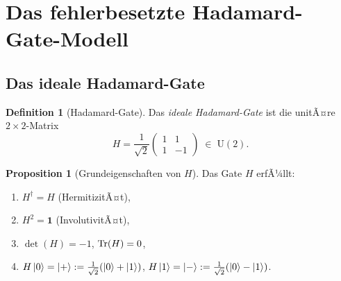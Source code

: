 ﻿\documentclass[11pt,a4paper]{article}
\theoremstyle{definition}
\newtheorem{proposition}[theorem]{Proposition}
\newtheorem{definition}[theorem]{Definition}
\begin{document}
\section{Das fehlerbesetzte Hadamard-Gate-Modell}
\label{sec:model}

\subsection{Das ideale Hadamard-Gate}
\label{subsec:ideal}

\begin{definition}[Hadamard-Gate]
  Das \emph{ideale Hadamard-Gate} ist die unitÃ¤re $2\times2$-Matrix
  \begin{equation}
    H = \frac{1}{\sqrt{2}} \begin{pmatrix} 1 & 1 \\ 1 & -1 \end{pmatrix}
    \;\in\; \mathrm{U}(2).
    \label{eq:H_def}
  \end{equation}
\end{definition}

\begin{proposition}[Grundeigenschaften von $H$]
\label{prop:H_props}
  Das Gate $H$ erfÃ¼llt:
  \begin{enumerate}[label=(\alph*)]
    \item $H^\dagger = H$ (HermitizitÃ¤t),
    \item $H^2 = \mathbf{1}$ (InvolutivitÃ¤t),
    \item $\det(H) = -1$, $\Tr(H) = 0$,
    \item $H\ket{0} = \ket{+} := \tfrac{1}{\sqrt{2}}(\ket{0}+\ket{1})$,
          $H\ket{1} = \ket{-} := \tfrac{1}{\sqrt{2}}(\ket{0}-\ket{1})$.
  \end{enumerate}
\end{proposition}
\end{document}
